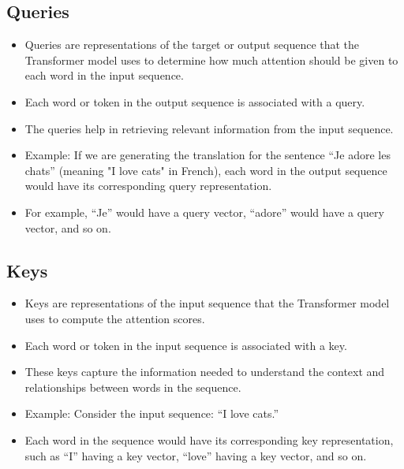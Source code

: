 \subsection{Queries}

\begin{itemize}
\item Queries are representations of the target or output sequence that the Transformer model uses to determine how much attention should be given to each word in the input sequence.
\item Each word or token in the output sequence is associated with a query.
\item The queries help in retrieving relevant information from the input sequence.
\item Example: If we are generating the translation for the sentence ``Je adore les chats'' (meaning "I love cats" in French), each word in the output sequence would have its corresponding query representation.
\item For example, ``Je'' would have a query vector, ``adore'' would have a query vector, and so on.


\end{itemize}


\subsection{Keys}
\begin{itemize}
\item Keys are representations of the input sequence that the Transformer model uses to compute the attention scores.
\item Each word or token in the input sequence is associated with a key.
\item These keys capture the information needed to understand the context and relationships between words in the sequence.
\item Example: Consider the input sequence: ``I love cats.''
\item Each word in the sequence would have its corresponding key representation, such as ``I'' having a key vector, ``love'' having a key vector, and so on.

\end{itemize}



